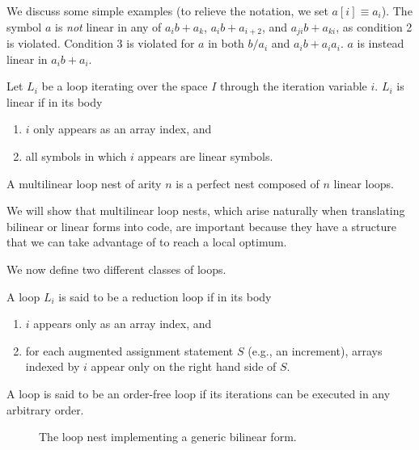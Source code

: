 We discuss some simple examples (to relieve the notation, we set $a[i] \equiv a_i$). The symbol $a$ is {\it not} linear in any of $a_i b + a_k$, $a_i b + a_{i+2}$, and $a_{ji} b + a_{ki}$, as condition 2 is violated. Condition 3 is violated for $a$ in both $b/a_i$ and $a_i b + a_i a_i$. $a$ is instead linear in $a_i b + a_i$.

\begin{Def}
\label{def:linear-loop}
Let $L_i$ be a loop iterating over the space $I$ through the iteration variable $i$. $L_i$ is linear if in its body
\begin{enumerate}
\item $i$ only appears as an array index, and
\item all symbols in which $i$ appears are linear symbols.
\end{enumerate}
\end{Def}

\begin{Def}
\label{def:multi-linear-loop}
A multilinear loop nest of arity $n$ is a perfect nest composed of $n$ linear loops.
\end{Def}

We will show that multilinear loop nests, which arise naturally when translating bilinear or linear forms into code, are important because they have a structure that we can take advantage of to reach a local optimum.

We now define two different classes of loops. 

\begin{Def}
\label{def:i-loop}
A loop $L_i$ is said to be a reduction loop if in its body
\begin{enumerate}
\item $i$ appears only as an array index, and
\item for each augmented assignment statement $S$ (e.g., an increment), arrays indexed by $i$ appear only on the right hand side of $S$.
\end{enumerate}
\end{Def}

\begin{Def}
\label{def:e-loop}
A loop is said to be an order-free loop if its iterations can be executed in any arbitrary order. 
\end{Def}

\begin{figure}\begin{CenteredBox}

\end{CenteredBox}\caption{The loop nest implementing a generic bilinear form.}\label{code:loopnest}\end{figure}


